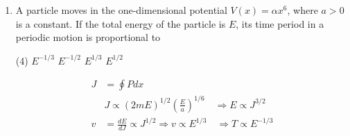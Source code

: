 \begin{enumerate}
	{}
\begin{tasks}(4)
\task[\textbf{A.}] $\left(\begin{array}{cc}\frac{1}{\sqrt{2}} & 1 \\ 1 & -\frac{1}{\sqrt{2}}\end{array}\right)$
\task[\textbf{B.}] $\left(\begin{array}{ll}\frac{1}{\sqrt{2}} & -\frac{1}{\sqrt{2}} \\ \frac{1}{\sqrt{2}} & \frac{1}{\sqrt{2}}\end{array}\right)$
\task[\textbf{C.}] $\left(\begin{array}{cc}\frac{1}{\sqrt{2}} & -\frac{1}{\sqrt{2}} \\ -\frac{1}{\sqrt{2}} & \frac{1}{\sqrt{2}}\end{array}\right)$
\task[\textbf{D.}] $\left(\begin{array}{cc}0 & -1 \\ 1 & 0\end{array}\right)$
\end{tasks}
\begin{answer}
\begin{align*}
\intertext{ The normal mode of given potential is $\left(\begin{array}{l}\frac{1}{\sqrt{2}} \\ \frac{1}{\sqrt{2}}\end{array}\right)$ and $\left(\begin{array}{l}-\frac{1}{\sqrt{2}} \\ \frac{1}{\sqrt{2}}\end{array}\right)$ in the basis of normal mode the potential can be diagonalise.}
\end{align*}
So the correct answer is \textbf{Option (B)}
\end{answer}
	\item  A particle moves in the one-dimensional potential $V(x)=\alpha x^{6}$, where $a>0$ is a constant. If the total energy of the particle is $E$, its time period in a periodic motion is proportional to
{	}
\begin{tasks}(4)
\task[\textbf{A.}] $E^{-1 / 3}$
\task[\textbf{B.}] $E^{-1 / 2}$
\task[\textbf{C.}] $E^{1 / 3}$
\task[\textbf{D.}] $E^{1 / 2}$
\end{tasks}
\begin{answer}
\begin{align*}
J&=\oint P d x\\
&J \propto(2 m E)^{1 / 2}\left(\frac{E}{a}\right)^{1 / 6} \quad \Rightarrow E \propto J^{3 / 2} \\ v&=\frac{d E}{d J} \propto J^{1 / 2} \Rightarrow v \propto E^{1 / 3} \quad \Rightarrow T \propto E^{-1 / 3}

\end{align*}
\end{answer}
\end{enumerate}
